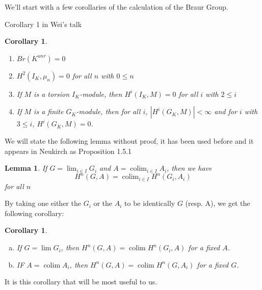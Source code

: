 \documentclass[a4paper]{article}
\title{}
\author{Jack J Garzella}
\newtheorem{lem}[thm]{Lemma}
\newtheorem{cor}[thm]{Corollary}
\newcommand{\colim}{\operatorname{colim}}
\begin{document}
\maketitle

We'll start with a few corollaries of the calculation of the Braur Group.

Corollary 1 in Wei's talk


\begin{cor}
	\begin{enumerate}[(1)]
		\item \(Br(K^{unr}) = 0\)
		\item \(H^{2}(I_{K},\mu_{n}) = 0\) for all \(n\) with \(0 \leq n\)
		\item If \(M\) is a torsion \(I_{K}\)-module, then
			\(H^{i}(I_{K},M) = 0\) for all \(i\) with \(2 \leq i\)
		\item If \(M\) is a finite \(G_{K}\)-module, then
			for all \(i\), \(\left| H^{i}(G_{K},M) \right| < \infty\) 
			and for \(i\) with \(3 \leq i\), 
			\(H^{i}(G_{K},M) = 0\).
	\end{enumerate}
\end{cor}

We will state the following lemma without proof, it has been used before
and it appears in Neukirch as Proposition 1.5.1

\begin{lem}
	If \(G = \lim_{i \in I} G_{i}\) and \(A = \colim_{i \in I} A_{i}\),
	then we have 
	\[
		H^{n}(G,A) = \colim_{i \in I} H^{n}(G_{i},A_{i})
	\] 
	for all \(n\)
\end{lem}

By taking one either the \(G_{i}\) or the \(A_{i}\) to be identically
\(G\) (resp. A), we get the following corollary:

\begin{cor}\label{cor:lim:cohom}
	\begin{enumerate}[(a)]
		\item If \(G = \lim G_{i}\), then 
			\(H^{n}(G,A) = \colim H^{n}(G_{i},A)\) for a fixed \(A\).
		\item IF \(A = \colim A_{i}\), then 
			\(H^{n}(G,A) = \colim H^{n}(G,A_{i})\) for a fixed \(G\).
	\end{enumerate}
\end{cor}

It is this corollary that will be most useful to us.
\end{document}
